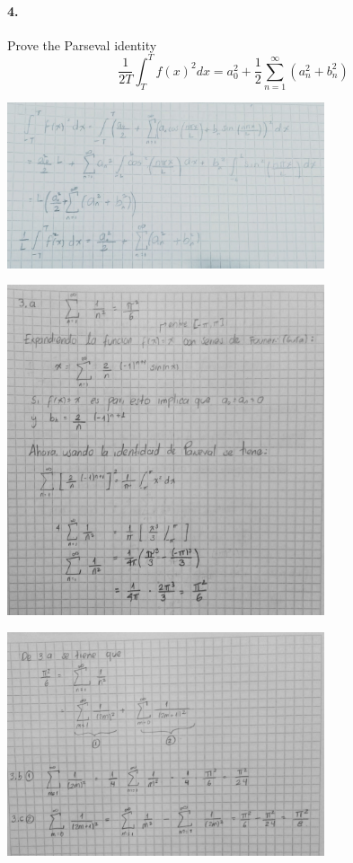 \documentclass{article}
\begin{document}
\paragraph{4.}Prove the Parseval identity
$$\frac{1}{2T}\int_{T}^{T} f(x)^2 dx = a_0^2 + \frac{1}{2} \sum_{n=1}^{\infty} (a_n^2 + b_n^2)$$
\begin{center}
	\includegraphics[width=0.7\textwidth]{img/4-1.jpeg}
\end{center}
\begin{center}
	\includegraphics[width=0.7\textwidth]{img/4-2.jpeg}
\end{center}
\newpage
\begin{center}
	\includegraphics[width=0.7\textwidth]{img/4-3.jpeg}
\end{center}
\newpage
\end{document}
